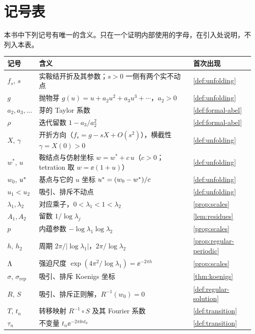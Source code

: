 \chapter{记号表}\label{app:notation}

本书中下列记号有唯一的含义。只在一个证明内部使用的字母，在引入处说明，不列入本表。

\begin{center}
\small
\begin{tabular}{p{}p{}p{}}
\toprule
记号 & 含义 & 首次出现\\
\midrule
$f_s$, $s$ & 实鞍结开折及其参数；$s>0$ 一侧有两个实不动点 & \cref{def:unfolding}\\
$g$ & 抛物芽 $g(u)=u+a_2u^2+a_3u^3+\cdots$，$a_2>0$ & \cref{def:unfolding}\\
$a_2,a_3,\dots$ & 芽的 Taylor 系数 & \cref{def:formal-abel}\\
$\rho$ & 迭代留数 $1-a_3/a_2^2$ & \cref{def:formal-abel}\\
$X$, $\gamma$ & 开折方向（$f_s=g-sX+O(s^2)$），横截性 $\gamma=X(0)>0$ & \cref{def:unfolding}\\
$w^*$, $u$ & 鞍结点与仿射坐标 $w=w^*+c\,u$（$c>0$；tetration 取 $w=\ee(1+u)$） & \cref{def:unfolding}\\
$w_0$, $u^{*}$ & 基点与它的 $u$ 坐标 $u^{*}=(w_0-w^*)/c$ & \cref{def:unfolding}\\
$u_1<u_2$ & 吸引、排斥不动点 & \cref{def:unfolding}\\
$\lambda_1,\lambda_2$ & 对应乘子，$0<\lambda_1<1<\lambda_2$ & \cref{prop:scales}\\
$A_1,A_2$ & 留数 $1/\log\lambda_j$ & \cref{lem:residues}\\
$p$ & 内蕴参数 $-\log\lambda_1\log\lambda_2$ & \cref{prop:scales}\\
$h$, $h_2$ & 周期 $2\pi/|\log\lambda_1|$，$2\pi/\log\lambda_2$ & \cref{prop:regular-periodic}\\
$\Lambda$ & 强迫尺度 $\exp(4\pi^2/\log\lambda_1)=\ee^{-2\pi h}$ & \cref{prop:scales}\\
$\sigma$, $\sigma_{\mathrm{rep}}$ & 吸引、排斥 Koenigs 坐标 & \cref{thm:koenigs}\\
$R$, $S$ & 吸引、排斥正则解，$R^{-1}(w_0)=0$ & \cref{def:regular-solution}\\
$T$, $t_n$ & 转移映射 $R^{-1}\circ S$ 及其 Fourier 系数 & \cref{def:transition}\\
$\tau_n$ & 不变量 $t_n\ee^{-2\pi\ii nt_0}$ & \cref{def:transition}\\

\end{tabular}
\end{center}
